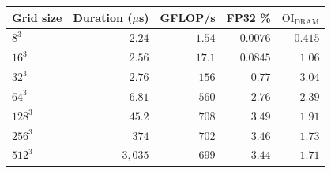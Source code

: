 \begin{tabular}{@{}lrrrr@{}}
\toprule
Grid size & Duration ($\mu$s) & GFLOP/s & FP32 \% & $\mathrm{OI}_{\text{DRAM}}$ \\
\midrule
$8^3$ & $2.24$ & $1.54$ & $0.0076$ & $0.415$ \\
$16^3$ & $2.56$ & $17.1$ & $0.0845$ & $1.06$ \\
$32^3$ & $2.76$ & $156$ & $0.77$ & $3.04$ \\
$64^3$ & $6.81$ & $560$ & $2.76$ & $2.39$ \\
$128^3$ & $45.2$ & $708$ & $3.49$ & $1.91$ \\
$256^3$ & $374$ & $702$ & $3.46$ & $1.73$ \\
$512^3$ & $3{,}035$ & $699$ & $3.44$ & $1.71$ \\
\bottomrule
\end{tabular}
